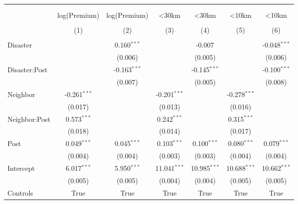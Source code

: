 
\begin{tabular}{@{\extracolsep{5pt}}lcccccc}
\\[-1.8ex]\hline
\hline \\[-1.8ex]
\\[-1.8ex] & \multicolumn{1}{c}{log(Premium)} & \multicolumn{1}{c}{log(Premium)} & \multicolumn{1}{c}{<30km} & \multicolumn{1}{c}{<30km} & \multicolumn{1}{c}{<10km} & \multicolumn{1}{c}{<10km}  \\
\\[-1.8ex] & (1) & (2) & (3) & (4) & (5) & (6) \\
\hline \\[-1.8ex]
 Disaster & & 0.160$^{***}$ & & -0.007$^{}$ & & -0.048$^{***}$ \\
& & (0.006) & & (0.005) & & (0.006) \\
 Disaster:Post & & -0.163$^{***}$ & & -0.145$^{***}$ & & -0.100$^{***}$ \\
& & (0.007) & & (0.005) & & (0.008) \\
 Neighbor & -0.261$^{***}$ & & -0.201$^{***}$ & & -0.278$^{***}$ & \\
& (0.017) & & (0.013) & & (0.016) & \\
 Neighbor:Post & 0.573$^{***}$ & & 0.242$^{***}$ & & 0.315$^{***}$ & \\
& (0.018) & & (0.014) & & (0.017) & \\
 Post & 0.049$^{***}$ & 0.045$^{***}$ & 0.103$^{***}$ & 0.100$^{***}$ & 0.080$^{***}$ & 0.079$^{***}$ \\
& (0.004) & (0.004) & (0.003) & (0.003) & (0.004) & (0.004) \\
Intercept & 6.017$^{***}$ & 5.950$^{***}$ & 11.041$^{***}$ & 10.985$^{***}$ & 10.688$^{***}$ & 10.662$^{***}$ \\
& (0.005) & (0.005) & (0.004) & (0.004) & (0.005) & (0.005) \\
Controls & True & True & True & True & True & True \\

\end{tabular}
